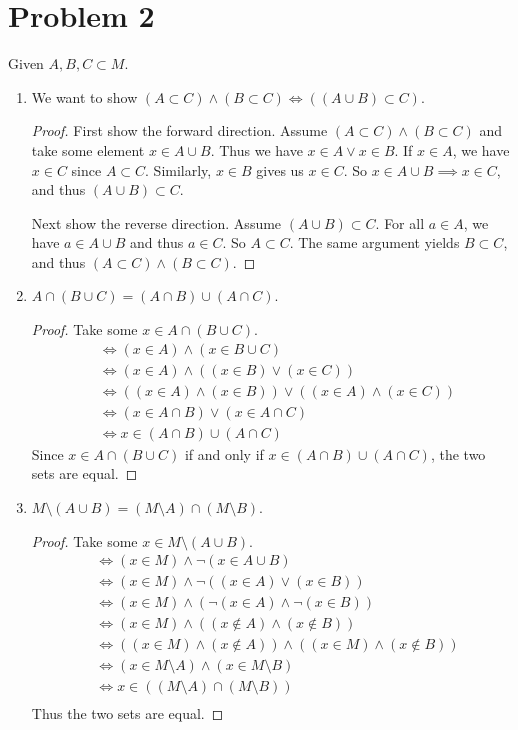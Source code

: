 \documentclass[11pt, oneside]{article}
\begin{document}
\section*{Problem 2}
Given $A, B, C \subset M$.
\begin{enumerate}
    \item We want to show $(A \subset C) \wedge (B \subset C) \iff ((A \cup B) \subset C)$.
    \begin{proof}
        First show the forward direction. Assume $(A \subset C) \wedge (B \subset C)$ and take some element $x \in A \cup B$. Thus we have $x \in A \vee x \in B$.
        If $x \in A$, we have $x \in C$ since $A \subset C$. Similarly, $x \in B$ gives us $x \in C$. So $x \in A \cup B \implies x \in C$, and thus $(A \cup B) \subset C$.

        Next show the reverse direction. Assume $(A \cup B) \subset C$. For all $a \in A$, we have $a \in A \cup B$ and thus $a \in C$. So $A \subset C$. The same argument yields $B \subset C$, and thus $(A \subset C) \wedge (B \subset C)$.
    \end{proof}
    \item $A \cap (B \cup C) = (A \cap B) \cup (A \cap C)$.
    \begin{proof}
        Take some $x \in A \cap (B \cup C)$.
        \begin{align*}
            &\iff (x \in A) \wedge (x \in B \cup C) \\
            &\iff (x \in A) \wedge ((x \in B) \vee (x \in C)) \\
            &\iff ((x \in A) \wedge (x \in B)) \vee ((x \in A) \wedge (x \in C)) \\
            &\iff (x \in A \cap B) \vee (x \in A \cap C) \\
            &\iff x \in (A \cap B) \cup (A \cap C)
        \end{align*}
        Since $x \in A \cap (B \cup C)$ if and only if $x \in (A \cap B) \cup (A \cap C)$, the two sets are equal.
    \end{proof}
    \item $M \setminus (A \cup B) = (M \setminus A) \cap (M \setminus B)$.
    \begin{proof}
        Take some $x \in M \setminus (A \cup B)$.
        \begin{align*}
            &\iff (x \in M) \wedge \neg (x \in A \cup B) \\
            &\iff (x \in M) \wedge \neg ((x \in A) \vee (x \in B)) \\
            &\iff (x \in M) \wedge (\neg (x \in A) \wedge \neg (x \in B)) \\
            &\iff (x \in M) \wedge ((x \notin A) \wedge (x \notin B)) \\
            &\iff ((x \in M) \wedge (x \notin A)) \wedge ((x \in M) \wedge (x \notin B)) \\
            &\iff (x \in M \setminus A) \wedge (x \in M \setminus B) \\
            &\iff x \in ((M \setminus A) \cap (M \setminus B)) \\
        \end{align*}
        Thus the two sets are equal.
    \end{proof}
\end{enumerate}
\end{document}
